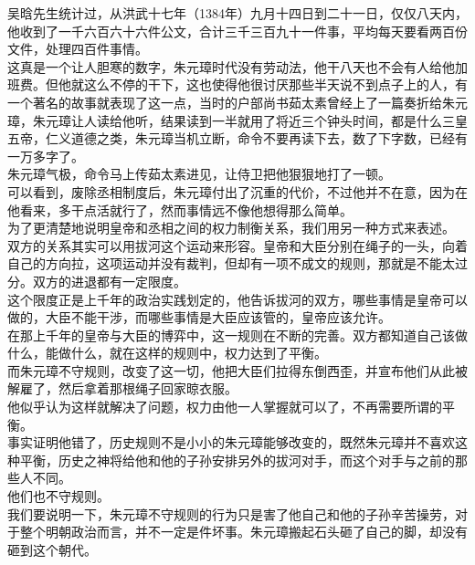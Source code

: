 \begin{multicols}{\theparacolNo}
吴晗先生统计过，从洪武十七年（1384年）九月十四日到二十一日，仅仅八天内，他收到了一千六百六十六件公文，合计三千三百九十一件事，平均每天要看两百份文件，处理四百件事情。\\

这真是一个让人胆寒的数字，朱元璋时代没有劳动法，他干八天也不会有人给他加班费。但他就这么不停的干下，这也使得他很讨厌那些半天说不到点子上的人，有一个著名的故事就表现了这一点，当时的户部尚书茹太素曾经上了一篇奏折给朱元璋，朱元璋让人读给他听，结果读到一半就用了将近三个钟头时间，都是什么三皇五帝，仁义道德之类，朱元璋当机立断，命令不要再读下去，数了下字数，已经有一万多字了。\\

朱元璋气极，命令马上传茹太素进见，让侍卫把他狠狠地打了一顿。\\

可以看到，废除丞相制度后，朱元璋付出了沉重的代价，不过他并不在意，因为在他看来，多干点活就行了，然而事情远不像他想得那么简单。\\

为了更清楚地说明皇帝和丞相之间的权力制衡关系，我们用另一种方式来表述。\\

双方的关系其实可以用拔河这个运动来形容。皇帝和大臣分别在绳子的一头，向着自己的方向拉，这项运动并没有裁判，但却有一项不成文的规则，那就是不能太过分。双方的进退都有一定限度。\\

这个限度正是上千年的政治实践划定的，他告诉拔河的双方，哪些事情是皇帝可以做的，大臣不能干涉，而哪些事情是大臣应该管的，皇帝应该允许。\\

在那上千年的皇帝与大臣的博弈中，这一规则在不断的完善。双方都知道自己该做什么，能做什么，就在这样的规则中，权力达到了平衡。\\

而朱元璋不守规则，改变了这一切，他把大臣们拉得东倒西歪，并宣布他们从此被解雇了，然后拿着那根绳子回家晾衣服。\\

他似乎认为这样就解决了问题，权力由他一人掌握就可以了，不再需要所谓的平衡。\\

事实证明他错了，历史规则不是小小的朱元璋能够改变的，既然朱元璋并不喜欢这种平衡，历史之神将给他和他的子孙安排另外的拔河对手，而这个对手与之前的那些人不同。\\

他们也不守规则。\\

我们要说明一下，朱元璋不守规则的行为只是害了他自己和他的子孙辛苦操劳，对于整个明朝政治而言，并不一定是件坏事。朱元璋搬起石头砸了自己的脚，却没有砸到这个朝代。\\


\end{multicols}
